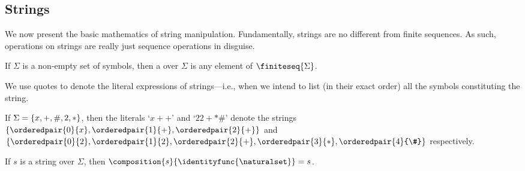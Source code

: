 \newpage
\subsection{Strings}
\noindent
We now present the basic mathematics of string manipulation.
Fundamentally, strings are no different from finite sequences.
As such, operations on strings are really just sequence operations in disguise.

\begin{dfn}[String]
     \label{dfn:metatheory-strings}
    If \( \Sigma \) is a non-empty set of symbols, then a  over \( \Sigma \) is any element of \( \finiteseq{\Sigma} \).
\end{dfn}

\begin{notation}[Literals]
     \label{notation:metatheory-literal-expressions-of-strings}
    We use quotes to denote the literal expressions of strings---i.e., when we intend to list (in their exact order) all the symbols constituting the
    string.
\end{notation}

\begin{eg}
    If \( \Sigma = \mleft\{ x, +, \#, 2, * \mright\} \),
    then the literals `\( {x}{+}{+} \)' and `\( 22+*\# \)' denote the strings
    \( \mleft\{ \orderedpair{0}{x}, \orderedpair{1}{+}, \orderedpair{2}{+} \mright\} \) and
    \( \mleft\{ \orderedpair{0}{2}, \orderedpair{1}{2}, \orderedpair{2}{+}, \orderedpair{3}{*}, \orderedpair{4}{\#} \mright\} \)
    respectively.
\end{eg}

\begin{thm}
     \label{thm:metatheory-the-composition-of-any-string-with-the-identity-function-of-N-is-the-string-itself}
    If \( s \) is a string over \( \Sigma \), then \( \composition{s}{ \identityfunc{\naturalset} } = s \).
\end{thm}

